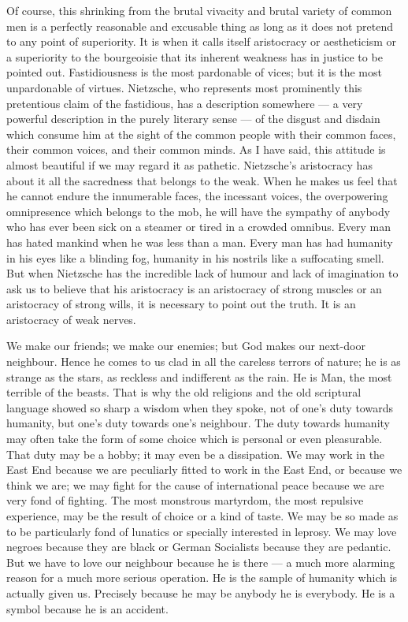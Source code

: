 Of course, this shrinking from the brutal vivacity and brutal variety of common men is a perfectly reasonable and excusable thing as long as it does not pretend to any point of superiority. It is when it calls itself aristocracy or aestheticism or a superiority to the bourgeoisie that its inherent weakness has in justice to be pointed out. Fastidiousness is the most pardonable of vices; but it is the most unpardonable of virtues. Nietzsche, who represents most prominently this pretentious claim of the fastidious, has a description somewhere — a very powerful description in the purely literary sense — of the disgust and disdain which consume him at the sight of the common people with their common faces, their common voices, and their common minds. As I have said, this attitude is almost beautiful if we may regard it as pathetic. Nietzsche’s aristocracy has about it all the sacredness that belongs to the weak. When he makes us feel that he cannot endure the innumerable faces, the incessant voices, the overpowering omnipresence which belongs to the mob, he will have the sympathy of anybody who has ever been sick on a steamer or tired in a crowded omnibus. Every man has hated mankind when he was less than a man. Every man has had humanity in his eyes like a blinding fog, humanity in his nostrils like a suffocating smell. But when Nietzsche has the incredible lack of humour and lack of imagination to ask us to believe that his aristocracy is an aristocracy of strong muscles or an aristocracy of strong wills, it is necessary to point out the truth. It is an aristocracy of weak nerves.

We make our friends; we make our enemies; but God makes our next-door neighbour. Hence he comes to us clad in all the careless terrors of nature; he is as strange as the stars, as reckless and indifferent as the rain. He is Man, the most terrible of the beasts. That is why the old religions and the old scriptural language showed so sharp a wisdom when they spoke, not of one’s duty towards humanity, but one’s duty towards one’s neighbour. The duty towards humanity may often take the form of some choice which is personal or even pleasurable. That duty may be a hobby; it may even be a dissipation. We may work in the East End because we are peculiarly fitted to work in the East End, or because we think we are; we may fight for the cause of international peace because we are very fond of fighting. The most monstrous martyrdom, the most repulsive experience, may be the result of choice or a kind of taste. We may be so made as to be particularly fond of lunatics or specially interested in leprosy. We may love negroes because they are black or German Socialists because they are pedantic. But we have to love our neighbour because he is there — a much more alarming reason for a much more serious operation. He is the sample of humanity which is actually given us. Precisely because he may be anybody he is everybody. He is a symbol because he is an accident.

